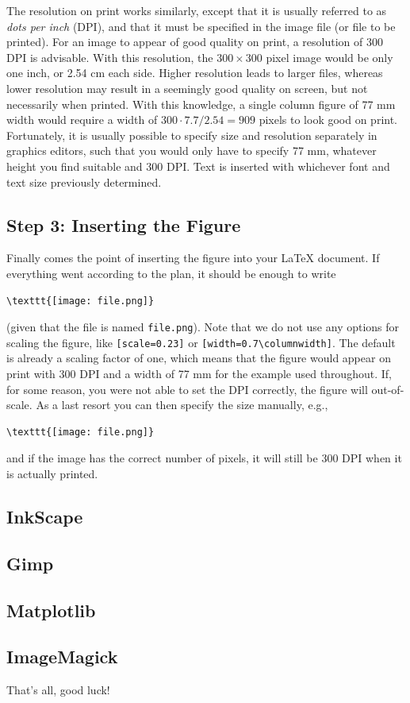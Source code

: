 \documentclass[a4paper,twocolumn]{article}
\begin{document}
The resolution on print works similarly, except that it is usually referred to as \emph{dots per inch} (DPI), and that it must be specified in the image file (or file to be printed). For an image to appear of good quality on print, a resolution of 300 DPI is advisable. With this resolution, the $300\times300$ pixel image would be only one inch, or 2.54 cm each side. Higher resolution leads to larger files, whereas lower resolution may result in a seemingly good quality on screen, but not necessarily when printed. With this knowledge, a single column figure of 77 mm width would require a width of $300\cdot7.7/2.54=909$ pixels to look good on print. Fortunately, it is usually possible to specify size and resolution separately in graphics editors, such that you would only have to specify 77 mm, whatever height you find suitable and 300 DPI. Text is inserted with whichever font and text size previously determined.

\subsection{Step 3: Inserting the Figure}
Finally comes the point of inserting the figure into your \LaTeX{} document.
If everything went according to the plan, it should be enough to write

\begin{verbatim}
\texttt{[image: file.png]}
\end{verbatim}
(given that the file is named \verb|file.png|). Note that we do not use any options for scaling the figure, like \verb|[scale=0.23]| or \verb|[width=0.7\columnwidth]|. The default is already a scaling factor of one, which means that the figure would appear on print with 300 DPI and a width of 77 mm for the example used throughout. If, for some reason, you were not able to set the DPI correctly, the figure will out-of-scale. As a last resort you can then specify the size manually, e.g.,
\begin{verbatim}
\texttt{[image: file.png]}
\end{verbatim}
and if the image has the correct number of pixels, it will still be 300 DPI when it is actually printed.

\subsection{InkScape}
\subsection{Gimp}
\subsection{Matplotlib}
\subsection{ImageMagick}


That's all, good luck!
\end{document}
